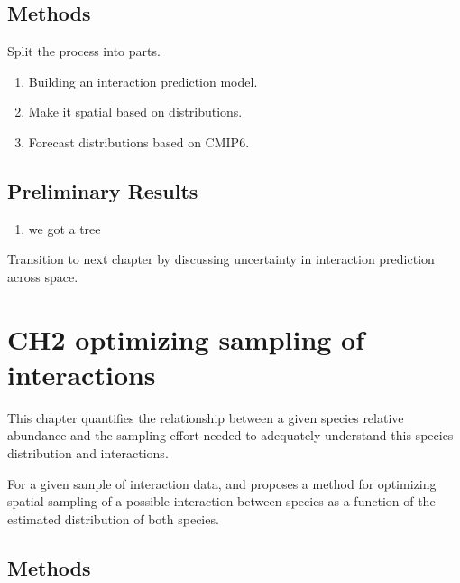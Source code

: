 \documentclass[10pt,oneside]{article}
\begin{document}
\hypertarget{methods}{%
\subsection{Methods}\label{methods}}

Split the process into parts.

\begin{enumerate}
\def\labelenumi{\arabic{enumi})}
\tightlist
\item
  Building an interaction prediction model.
\item
  Make it spatial based on distributions.
\item
  Forecast distributions based on CMIP6.
\end{enumerate}

\hypertarget{preliminary-results}{%
\subsection{Preliminary Results}\label{preliminary-results}}

\begin{enumerate}
\def\labelenumi{\arabic{enumi})}
\tightlist
\item
  we got a tree
\end{enumerate}

Transition to next chapter by discussing uncertainty in interaction
prediction across space.

\hypertarget{ch2-optimizing-sampling-of-interactions}{%
\section{CH2 optimizing sampling of
interactions}\label{ch2-optimizing-sampling-of-interactions}}

This chapter quantifies the relationship between a given species
relative abundance and the sampling effort needed to adequately
understand this species distribution and interactions.

For a given sample of interaction data, and proposes a method for
optimizing spatial sampling of a possible interaction between species as
a function of the estimated distribution of both species.

\hypertarget{methods-1}{%
\subsection{Methods}\label{methods-1}}
\end{document}
